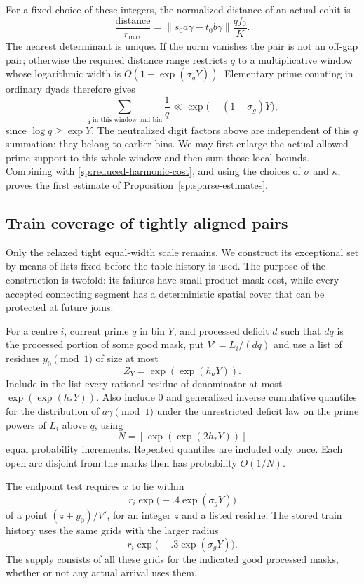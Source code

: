 For a fixed choice of these integers, the normalized distance of an
actual cohit is
\[
 \frac{\text{distance}}{r_{\max}}
 =\|s_0a\gamma-t_0b\gamma\|\frac{qf_0}{K}.
\]
The nearest determinant is unique.  If the norm vanishes the pair is
not an off-gap pair; otherwise the required distance range restricts
$q$ to a multiplicative window whose logarithmic width is
$O(1+\exp(\sigma_gY))$.  Elementary prime counting in ordinary dyads
therefore gives
\[
 \sum_{q\text{ in this window and bin}}\frac1q
 \ll \exp\bigl(-(1-\sigma_g)Y\bigr),
\]
since $\log q\ge\exp Y$.  The neutralized digit factors above are
independent of this $q$ summation: they belong to earlier bins.  We may
first enlarge the actual allowed prime support to this whole window
and then sum those local bounds.  Combining with
\eqref{sp:reduced-harmonic-cost}, and using the choices of $\sigma$ and
$\kappa$, proves the first estimate of
Proposition~\ref{sp:sparse-estimates}.

\subsection{Train coverage of tightly aligned pairs}

Only the relaxed tight equal-width scale remains.  We construct its
exceptional set by means of lists fixed before the table history is
used.  The purpose of the construction is twofold: its failures have
small product-mask cost, while every accepted connecting segment has
a deterministic spatial cover that can be protected at future joins.

\begin{construction}\label{sp:danger-trains}
For a centre $i$, current prime $q$ in bin $Y$, and processed deficit
$d$ such that $dq$ is the processed portion of some good mask, put
$V'=L_i/(dq)$ and use a list of residues $y_0\pmod1$ of size at most
\[
 Z_Y=\exp(\exp(h_aY)).
\]
Include in the list every rational residue of denominator at most
$\exp(\exp(h_*Y))$.  Also include $0$ and generalized inverse
cumulative quantiles for the distribution of $a\gamma\pmod1$ under
the unrestricted deficit law on the prime powers of $L_i$ above $q$,
using
\[
 N=\left\lceil\exp(\exp(2h_*Y))\right\rceil
\]
equal probability increments.  Repeated quantiles are included only
once.  Each open arc disjoint from the marks then has probability
$O(1/N)$.

The endpoint test requires $x$ to lie within
\[
 r_i\exp\bigl(-.4\exp(\sigma_gY)\bigr)
\]
of a point $(z+y_0)/V'$, for an integer $z$ and a listed residue.
The stored train history uses the same grids with the larger radius
\[
 r_i\exp\bigl(-.3\exp(\sigma_gY)\bigr).
\]
The supply consists of all these grids for the indicated good processed
masks, whether or not any actual arrival uses them.
\end{construction}

